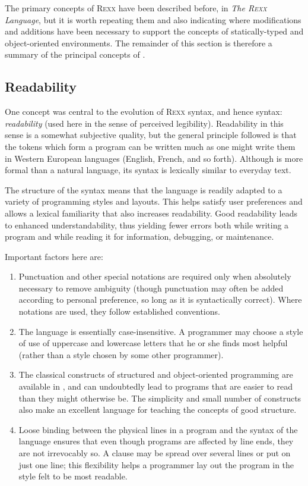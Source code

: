 The primary concepts of R\textsc{exx} have been described before, in \emph{The
  R\textsc{exx} Language}, but it is worth repeating them and also indicating
where modifications and additions have been necessary to support the
concepts of statically-typed and object-oriented environments. The
remainder of this section is therefore a summary of the principal
concepts of \nr{}.
\subsection{Readability}
One concept was central to the evolution of R\textsc{exx} syntax, and hence \nr{} syntax: \emph{readability} (used here in the sense of perceived legibility). Readability in this sense is a somewhat subjective quality, but the general principle followed is that the tokens which form a program can be written much as one might write them in Western European languages (English, French, and so forth). Although \nr{} is more formal than a natural language, its syntax is lexically similar to everyday text.

The structure of the syntax means that the language is readily adapted
to a variety of programming styles and layouts. This helps satisfy
user preferences and allows a lexical familiarity that also increases
readability. Good readability leads to enhanced understandability,
thus yielding fewer errors both while writing a program and while
reading it for information, debugging, or maintenance. 

Important factors here are:
\begin{enumerate}
\item Punctuation and other special notations are required only when absolutely necessary to remove ambiguity (though punctuation may often be added according to personal preference, so long as it is syntactically correct). Where notations are used, they follow established conventions.
\item The language is essentially case-insensitive. A \nr{}
  programmer may choose a style of use of uppercase and lowercase letters that he or she finds most helpful (rather than a style chosen by some other programmer).
\item The classical constructs of structured and object-oriented
  programming are available in \nr{}, and can undoubtedly lead to
  programs that are easier to read than they might otherwise be. The
  simplicity and small number of constructs also make \nr{} an
  excellent language for teaching the concepts of good structure.
\item Loose binding between the physical lines in a program and the syntax of the language ensures that even though programs are affected by line ends, they are not irrevocably so. A clause may be spread over several lines or put on just one line; this flexibility helps a programmer lay out the program in the style felt to be most readable.
\end{enumerate}
